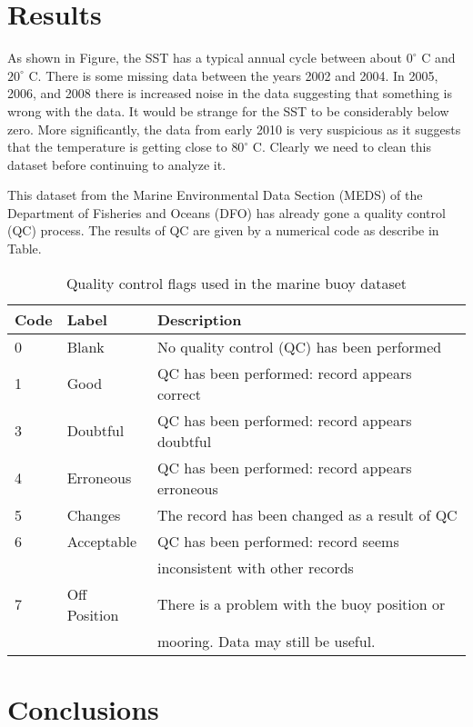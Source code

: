 \documentclass[12pt, letterpaper]{article}
\begin{document}
\section{Results}

As shown in Figure, the SST has a typical annual cycle between about $0^\circ$ C and $20^\circ$ C. There is some missing data between the years 2002 and 2004.  In 2005, 2006, and 2008 there is
increased noise in the data suggesting that something is wrong with the data.  It would be strange for the SST to be considerably below zero.  More significantly, the data from early 2010 is very suspicious as it suggests that the temperature is getting close to $80^\circ$ C.  Clearly we need to clean this dataset before continuing to analyze it.


This dataset from the Marine Environmental Data Section (MEDS) of the Department of Fisheries and Oceans (DFO) has already gone a quality control (QC) process. The results of QC are given by a numerical code as describe in Table.

\begin{table}[h]
\begin{tabular}{|l|l|l|}
\hline
Code & Label & Description \\
\hline
0 & Blank & No quality control (QC) has been performed \\
1 & Good & QC has been performed: record appears correct \\
3 & Doubtful &  QC has been performed: record appears doubtful \\
4 & Erroneous & QC has been performed: record appears erroneous \\
5 & Changes & The record has been changed as a result of QC \\
6 & Acceptable & QC has been performed: record seems \\  & & inconsistent with other records \\
7 & Off Position & There is a problem with the buoy position or \\ & & mooring. Data may still be useful. \\
\hline
\end{tabular}
\caption{Quality control flags used in the marine buoy dataset}
\label{tbl:qc_codes}
\end{table}





\section{Conclusions}


\end{document}
